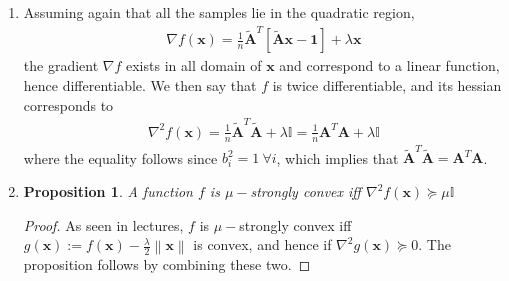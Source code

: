 \documentclass[letterpaper]{article}
\providecommand{\xx}{\mathbf{x}}
\providecommand{\yy}{\mathbf{y}}
\providecommand{\1}{\mathbf{1}}
\providecommand{\0}{\mathbf{0}}
\providecommand{\mA}{\mathbf{A}}
\providecommand{\norm}[1]{\ensuremath{\left\lVert#1\right\rVert}}
\newtheorem{proposition}{Proposition}
\begin{document}
\begin{enumerate}[label=(\alph*)]
    Assume that all the samples lie in the quadratic region
    \begin{align}
        \norm{\nabla f(\xx) - \nabla f(\yy)} &= \norm{\lambda (\xx - \yy) + \frac{1}{n}\tilde{\mA}^T \tilde{\mA} (\xx - \yy)} = \norm{\left( \lambda\mathbf{I} + \frac{1}{n}\tilde{\mA}^T \tilde{\mA} \right) (\xx - \yy)} \\
        &\leq \norm{\lambda\mathbf{I} + \frac{1}{n}\tilde{\mA}^T \tilde{\mA}} \norm{\xx - \yy}
    \end{align}
    where the inequality follows from definition of the spectral norm.
    
    The spectral norm satisfies the triangle inequality (as every norm), so 
    \begin{align}
        \norm{\lambda\mathbf{I} + \frac{1}{n}\tilde{\mA}^T \tilde{\mA}} &:= \max_{\xx:\norm{\xx}=1} \norm{\left( \lambda\mathbf{I} + \frac{1}{n}\tilde{\mA}^T \tilde{\mA} \right) \xx} \leq |\lambda| \max_{\xx:\norm{\xx}=1} \norm{\xx}  +\frac{1}{n} \max_{\xx:\norm{\xx}=1}  \norm{\tilde{\mA}^T \tilde{\mA}\xx} \\
        &:= \lambda + \frac{1}{n}\norm{\tilde{\mA}^T \tilde{\mA}} \leq \lambda + \frac{1}{n}\norm{\tilde{\mA}^T} \norm{\tilde{\mA}}
    \end{align}
    where the last inequality again follows from definition of the spectral norm. The proof is completed using the fact that $\norm{\tilde{\mA}}=\norm{\mA}$ and $\norm{\tilde{\mA}^T}=\norm{\mA^T}$.
    
    \item Assuming again that all the samples lie in the quadratic region,
    \begin{align}
        \nabla f(\xx) = \frac{1}{n} \tilde{\mA}^T [\tilde{\mA} \xx - \1] + \lambda \xx
    \end{align}
    the gradient $\nabla f$ exists in all domain of $\xx$ and correspond to a linear function, hence differentiable. We then say that $f$ is twice differentiable, and its hessian corresponds to
    \begin{align}
        \nabla^2 f(\xx) = \frac{1}{n} \tilde{\mA}^T \tilde{\mA} + \lambda\mathbb{I}=\frac{1}{n}\mA^T \mA + \lambda\mathbb{I}
    \end{align}
    where the equality follows since $b_i^2 = 1 \ \forall i$, which implies that $\tilde{\mA}^T \tilde{\mA} = \mA^T \mA$.
    
    \item 
    \begin{proposition}
        A function $f$ is $\mu-$strongly convex iff $\nabla^2 f(\xx) \succeq \mu \mathbb{I}$
        \label{prop:1}
    \end{proposition}
    \begin{proof}
        As seen in lectures, $f$ is $\mu-$strongly convex iff $g(\xx):=f(\xx)-\frac{\lambda}{2}\norm{\xx}$ is convex, and hence if $\nabla^2g(\xx) \succeq 0$. The proposition follows by combining these two.
    \end{proof}
    

\end{enumerate}
\end{document}
